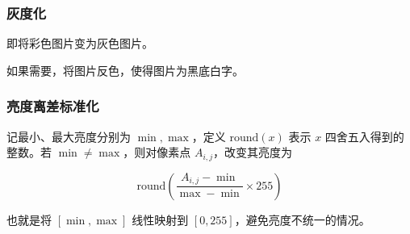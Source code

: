 \documentclass[10pt,aspectratio=43,serif]{beamer}
\begin{document}
\begin{frame}
    \frametitle{灰度化}
    即将彩色图片变为灰色图片。
    
    如果需要，将图片反色，使得图片为黑底白字。
    
    \begin{figure}
        \qquad
    \end{figure}
\end{frame}

\begin{frame}
    \frametitle{亮度离差标准化}
    记最小、最大亮度分别为 $\min, \max$，定义 $\text{round}(x)$ 表示 $x$ 四舍五入得到的整数。若 $\min \neq \max$，则对像素点 $A_{i, j}$，改变其亮度为
    
    $$\text{round}(\frac {A_{i, j} - \min}{\max - \min} \times 255)$$
    
    也就是将 $[\min, \max]$ 线性映射到 $[0, 255]$，避免亮度不统一的情况。
    
    \begin{figure}
        \qquad
    \end{figure}
\end{frame}
\end{document}
